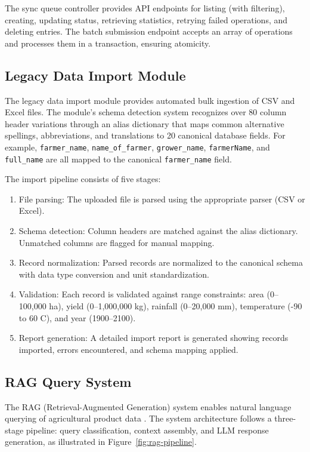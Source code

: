 \documentclass[12pt,a4paper,oneside]{report}
\begin{document}
The sync queue controller provides API endpoints for listing (with filtering), creating, updating status, retrieving statistics, retrying failed operations, and deleting entries. The batch submission endpoint accepts an array of operations and processes them in a transaction, ensuring atomicity.

\subsection{Legacy Data Import Module}
The legacy data import module provides automated bulk ingestion of CSV and Excel files. The module's schema detection system recognizes over 80 column header variations through an alias dictionary that maps common alternative spellings, abbreviations, and translations to 20 canonical database fields. For example, \texttt{farmer\_name}, \texttt{name\_of\_farmer}, \texttt{grower\_name}, \texttt{farmerName}, and \texttt{full\_name} are all mapped to the canonical \texttt{farmer\_name} field.

The import pipeline consists of five stages:
\begin{enumerate}
  \item File parsing: The uploaded file is parsed using the appropriate parser (CSV or Excel).
  \item Schema detection: Column headers are matched against the alias dictionary. Unmatched columns are flagged for manual mapping.
  \item Record normalization: Parsed records are normalized to the canonical schema with data type conversion and unit standardization.
  \item Validation: Each record is validated against range constraints: area (0--100,000 ha), yield (0--1,000,000 kg), rainfall (0--20,000 mm), temperature (-90 to 60 C), and year (1900--2100).
  \item Report generation: A detailed import report is generated showing records imported, errors encountered, and schema mapping applied.
\end{enumerate}

\subsection{RAG Query System}
The RAG (Retrieval-Augmented Generation) system enables natural language querying of agricultural product data . The system architecture follows a three-stage pipeline: query classification, context assembly, and LLM response generation, as illustrated in Figure~\ref{fig:rag-pipeline}.
\end{document}
